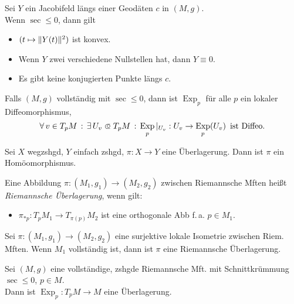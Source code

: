 \documentclass{cheat-sheet}
\DeclareMathOperator{\Exp}{Exp} %
\begin{document}


\begin{satz}
  Sei $Y$ ein Jacobifeld längs einer Geodäten $c$ in $(M, g)$. \\
  Wenn $\sec \leq 0$, dann gilt
  \begin{itemize}
    \item $(t \mapsto \lVert Y(t)\rVert^2)$ ist konvex.
    \item Wenn $Y$ zwei verschiedene Nullstellen hat, dann $Y \equiv 0$.
    \item Es gibt keine konjugierten Punkte längs $c$.
  \end{itemize}
\end{satz}

\begin{kor}
  Falls $(M, g)$ vollständig mit $\sec \leq 0$, dann ist $\Exp_p$ für alle $p$ ein lokaler Diffeomorphismus, \dh{}
  \[
    \fa{v \in T_p M} \ex{U_v \opn T_p M} \Exp_p |_{U_v} : U_v \to \Exp_p(U_v)
    \enspace \text{ist Diffeo.}
  \]
\end{kor}

\begin{satz}
  Sei $X$ wegzshgd, $Y$ einfach zshgd, $\pi : X \to Y$ eine Überlagerung. Dann ist $\pi$ ein Homöomorphismus.
\end{satz}

\begin{defn}
  Eine Abbildung $\pi : (M_1, g_1) \to (M_2, g_2)$ zwischen Riemannsche Mften heißt \emph{Riemannsche Überlagerung}, wenn gilt:
  \begin{itemize}
    \item $\pi_{*p} : T_p M_1 \to T_{\pi(p)} M_2$ ist eine orthogonale Abb f.\,a. $p \in M_1$.
  \end{itemize}
\end{defn}

\begin{satz}
  Sei $\pi : (M_1, g_1) \to (M_2, g_2)$ eine surjektive lokale Isometrie zwischen Riem. Mften. Wenn $M_1$ vollständig ist, dann ist $\pi$ eine Riemannsche Überlagerung.
\end{satz}

\begin{satz}
  Sei $(M, g)$ eine vollständige, zshgde Riemannsche Mft. mit Schnittkrümmung $\sec \leq 0$, $p \in M$. \\
  Dann ist $\Exp_p : T_p M \to M$ eine Überlagerung.
\end{satz}
\end{document}
